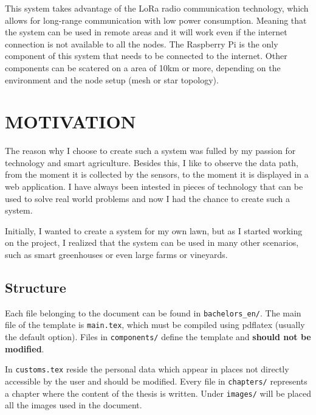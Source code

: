 This system takes advantage of the LoRa radio communication technology, 
which allows for long-range communication with low power consumption. Meaning that the system can be used in remote areas and
it will work even if the internet connection is not available to all the nodes. The Raspberry Pi is the only component of this system
that needs to be connected to the internet. Other components can be scatered on a area of 10km or more, depending on
the environment and the node setup (mesh or star topology).

\newpage
\section{MOTIVATION}


The reason why I choose to create such a system was fulled by my passion for technology and smart agriculture. Besides this,
I like to observe the data path, from the moment it is collected by the sensors, to the moment it is displayed
in a web application. 
I have always been intested in pieces of technology that can be used to solve real world problems and now I had the chance
to create such a system.

Initially, I wanted to create a system for my own lawn, but as I started working on the project, I realized that the system
can be used in many other scenarios, such as smart greenhouses or even large farms or vineyards. 
\subsection{Structure} \label{section:structure}
Each file belonging to the document can be found in \texttt{bachelors\_en/}.
The main file of the template is \texttt{main.tex}, which must be compiled using pdflatex (usually the default option). Files in \texttt{components/} define the template and \textbf{should not be modified}.

In \texttt{customs.tex} reside the personal data which appear in places not directly accessible by the user and should be modified. Every file in \texttt{chapters/} represents a chapter where the content of the thesis is written. Under \texttt{images/} will be placed all the images used in the document.

